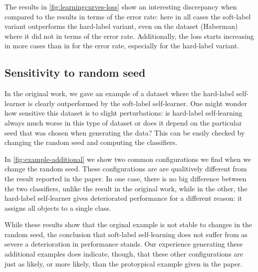 \documentclass[runningheads,a4paper]{llncs}\usepackage[]{graphicx}\usepackage[]{color}
\begin{document}
The results in \cref{fig:learningcurves-loss} show an interesting discrepancy when compared to the results in terms of the error rate: here in all cases the soft-label variant outperforms the hard-label variant, even on the dataset (Haberman) where it did not in terms of the error rate. Additionally, the loss starts increasing in more cases than in for the error rate, especially for the hard-label variant.

\subsection{Sensitivity to random seed}
In the original work, we gave an example of a dataset where the hard-label self-learner is clearly outperformed by the soft-label self-learner. One might wonder how sensitive this dataset is to slight perturbations: is hard-label self-learning always much worse in this type of dataset or does it depend on the particular seed that was chosen when generating the data? This can be easily checked by changing the random seed and computing the classifiers. 

In \cref{fig:example-additional} we show two common configurations we find when we change the random seed. These configurations are are qualitively different from the result reported in the paper. In one case, there is no big difference between the two classifiers, unlike the result in the original work, while in the other, the hard-label self-learner gives deteriorated performance for a different reason: it assigns all objects to a single class. 

While these results show that the orginal example is not stable to changes in the random seed, the conclusion that soft-label self-learning does not suffer from as severe a deterioration in performance stands. Our experience generating these additional examples does indicate, though, that these other configurations are just as likely, or more likely, than the protoypical example given in the paper.
\end{document}
